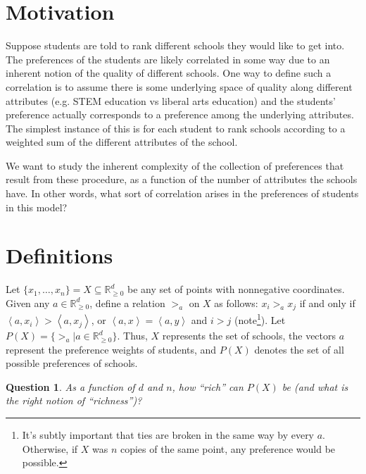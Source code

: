 \documentclass[12pt]{article}
\newtheorem*{question}{Question}
\newcommand{\Rgz}{\mathbb{R}_{\ge 0}}
\newcommand{\ip}[2]{\left\langle{#1},{#2}\right\rangle}
\newcommand{\1}[1]{\mathds{1}[{#1}]}
\begin{document}
\section{Motivation}
  Suppose students are told to rank different schools they would like to
  get into. The preferences of the students are likely correlated in some
  way due to an inherent notion of the quality of different schools.
  One way to define such a correlation is to assume there is some underlying
  space of quality along different attributes (e.g. STEM education vs
  liberal arts education) and the students' preference actually corresponds
  to a preference among the underlying attributes.
  The simplest instance of this is for each student to rank schools
  according to a weighted sum of the different attributes of the school.

  We want to study the inherent complexity of the collection of preferences
  that result from these procedure, as a function of the number of attributes
  the schools have. In other words, what sort of correlation arises in the
  preferences of students in this model?


\section{Definitions}

  Let $\{x_1,\ldots,x_n\} = X\subseteq \Rgz^d$ be any set of points
  with nonnegative coordinates.
  Given any $a\in \Rgz^d$, define a relation $>_a$ on $X$ as follows:
  $x_i >_a x_j$ if and only if $\ip{a}{x_i} > \ip{a}{x_j}$, or
  $\ip{a}{x} = \ip{a}{y}$ and $i > j$ (note\footnote{
    It's subtly important that ties are broken in the same way by every $a$.
    Otherwise, if $X$ was $n$ copies of the same point, any preference
    would be possible.
  }).
  Let $P(X) = \{ >_a | a\in\Rgz^d \}$.
  Thus, $X$ represents the set of schools,
  the vectors $a$ represent the preference weights of students,
  and $P(X)$ denotes the set of all possible preferences of schools.

  \begin{question}
    As a function of $d$ and $n$, how ``rich'' can $P(X)$ be
    (and what is the right notion of ``richness'')?
  \end{question}
\end{document}
